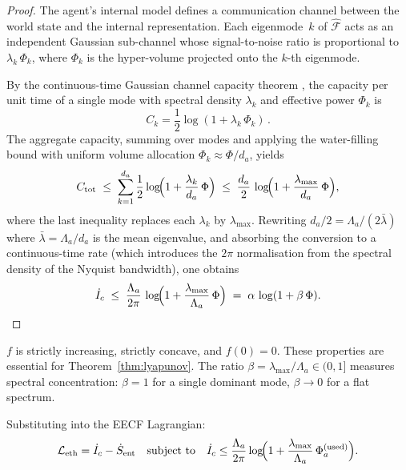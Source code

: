 \begin{proof}
The agent's internal model defines a communication channel between the
world state and the internal representation.  Each eigenmode~$k$ of
$\hat{\mathcal{F}}$ acts as an independent Gaussian sub-channel whose
signal-to-noise ratio is proportional to $\lambda_k\,\Phi_k$, where
$\Phi_k$ is the hyper-volume projected onto the $k$-th eigenmode.

By the continuous-time Gaussian channel capacity theorem
\cite{Shannon1948,CoverThomas2006}, the capacity per unit time of a
single mode with spectral density $\lambda_k$ and effective power
$\Phi_k$ is
\[
    C_k = \frac{1}{2}\log(1+\lambda_k\,\Phi_k)\,.
\]
The aggregate capacity, summing over modes and applying the water-filling
bound with uniform volume allocation $\Phi_k\approx\Phi/d_a$, yields
\[
    C_{\mathrm{tot}}
    \;\leq\;
    \sum_{k=1}^{d_a}\frac{1}{2}\log\!\Bigl(1+\frac{\lambda_k}{d_a}\,\Phi\Bigr)
    \;\leq\;
    \frac{d_a}{2}\,\log\!\Bigl(1+\frac{\lambda_{\max}}{d_a}\,\Phi\Bigr),
\]
where the last inequality replaces each $\lambda_k$ by $\lambda_{\max}$.
Rewriting $d_a/2 = \Lambda_a/(2\bar\lambda)$ where
$\bar\lambda=\Lambda_a/d_a$ is the mean eigenvalue, and absorbing
the conversion to a continuous-time rate (which introduces the
$2\pi$ normalisation from the spectral density of the Nyquist
bandwidth), one obtains
\[
    \dot{I}_c
    \;\leq\;
    \frac{\Lambda_a}{2\pi}\,\log\!\Bigl(1+\frac{\lambda_{\max}}{\Lambda_a}\,\Phi\Bigr)
    \;=\;
    \alpha\,\log(1+\beta\,\Phi).
    \qedhere
\]
\end{proof}

\begin{remark}[Properties of $f$]
$f$ is strictly increasing, strictly concave, and $f(0)=0$.
These properties are essential for Theorem~\ref{thm:lyapunov}.
The ratio $\beta=\lambda_{\max}/\Lambda_a\in(0,1]$ measures
spectral concentration: $\beta=1$ for a single dominant mode,
$\beta\to 0$ for a flat spectrum.
\end{remark}

Substituting into the EECF Lagrangian:
\begin{equation}
\label{eq:Leth-constrained}
    \mathcal{L}_{\mathrm{eth}}
    = \dot{I}_c - \dot{S}_{\mathrm{ent}}
    \quad\text{subject to}\quad
    \dot{I}_c
    \leq \frac{\Lambda_a}{2\pi}
         \log\!\Bigl(1+\frac{\lambda_{\max}}{\Lambda_a}\,\Phi_a^{(\mathrm{used})}\Bigr).
\end{equation}


